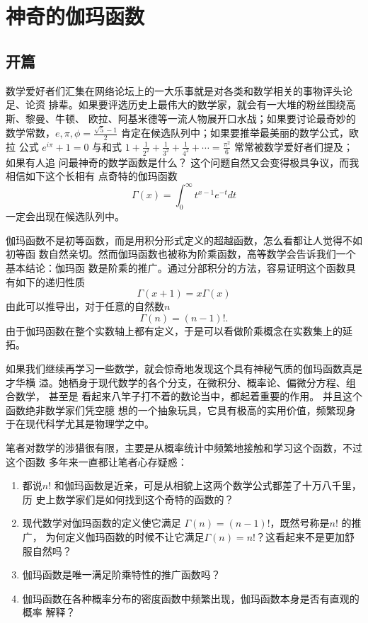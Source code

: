 %
\chapter{神奇的伽玛函数}

\section{开篇}

数学爱好者们汇集在网络论坛上的一大乐事就是对各类和数学相关的事物评头论足、论资
排辈。如果要评选历史上最伟大的数学家，就会有一大堆的粉丝围绕高斯、黎曼、牛顿、
欧拉、阿基米德等一流人物展开口水战；如果要讨论最奇妙的数学常数，$e, \pi,
\phi=\frac{\sqrt{5}-1}{2} $ 肯定在候选队列中；如果要推举最美丽的数学公式，欧拉
公式 $e^{i\pi} + 1= 0$  与和式 $ 1 + \frac{1}{2^2} + \frac{1}{3^2} +
\frac{1}{4^2} +  \cdots  = \frac{\pi^2}{6} $ 常常被数学爱好者们提及；如果有人追
问最神奇的数学函数是什么？ 这个问题自然又会变得极具争议，而我相信如下这个长相有
点奇特的伽玛函数
$$ \Gamma(x)=\int_0^{\infty}t^{x-1}e^{-t}dt $$
一定会出现在候选队列中。 

伽玛函数不是初等函数，而是用积分形式定义的超越函数，怎么看都让人觉得不如初等函
数自然亲切。然而伽玛函数也被称为阶乘函数，高等数学会告诉我们一个基本结论：伽玛函
数是阶乘的推广。通过分部积分的方法，容易证明这个函数具有如下的递归性质
$$\Gamma(x+1) = x \Gamma(x)$$
由此可以推导出，对于任意的自然数$n$
$$\Gamma(n) = (n-1)! .$$
由于伽玛函数在整个实数轴上都有定义，于是可以看做阶乘概念在实数集上的延拓。

如果我们继续再学习一些数学，就会惊奇地发现这个具有神秘气质的伽玛函数真是才华横
溢。她栖身于现代数学的各个分支，在微积分、概率论、偏微分方程、组合数学， 甚至是
看起来八竿子打不着的数论当中，都起着重要的作用。 并且这个函数绝非数学家们凭空臆
想的一个抽象玩具，它具有极高的实用价值，频繁现身于在现代科学尤其是物理学之中。

笔者对数学的涉猎很有限，主要是从概率统计中频繁地接触和学习这个函数，不过这个函数
多年来一直都让笔者心存疑惑：
\begin{enumerate}
\item 都说$n!$ 和伽玛函数是近亲，可是从相貌上这两个数学公式都差了十万八千里，历
史上数学家们是如何找到这个奇特的函数的？
\item 现代数学对伽玛函数的定义使它满足 $\Gamma(n) = (n-1)!$，既然号称是$n!$ 的推广，
为何定义伽玛函数的时候不让它满足$\Gamma(n) = n!$？这看起来不是更加舒服自然吗？
\item 伽玛函数是唯一满足阶乘特性的推广函数吗？
\item 伽玛函数在各种概率分布的密度函数中频繁出现，伽玛函数本身是否有直观的概率
解释？
\end{enumerate}

